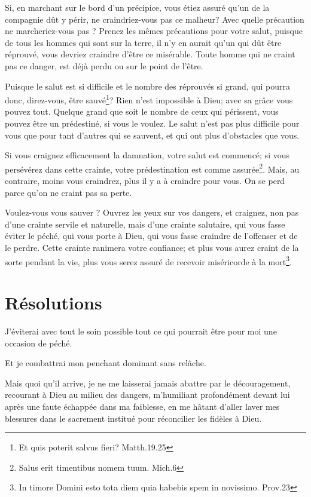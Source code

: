 \documentclass[instructions.tex]{subfiles}
\begin{document}
Si, en marchant sur le bord d'un précipice, vous étiez assuré qu'un de la compagnie dût y périr, ne craindriez-vous pas ce malheur? Avec quelle précaution ne marcheriez-vous pas ? Prenez les mêmes précautions pour votre salut, puisque de tous les hommes qui sont sur la terre, il n'y en aurait qu'un qui dût être réprouvé, vous devriez craindre d'être ce misérable. Toute homme qui ne craint pas ce danger, est déjà perdu ou sur le point de l'être.

Puisque le salut est si difficile et le nombre des réprouvés si grand, qui pourra donc, direz-vous, être sauvé\footnote{Et quis poterit salvus fieri? Matth.19.25}? Rien n'est impossible à Dieu; avec sa grâce vous pouvez tout. Quelque grand que soit le nombre de ceux qui périssent, vous pouvez être un prédestiné, si vous le voulez. Le salut n'est pas plus difficile pour vous que pour tant d'autres qui se sauvent, et qui ont plus d'obstacles que vous.

Si vous craignez efficacement la damnation, votre salut est commencé; si vous persévérez dans cette crainte, votre prédestination est comme assurée\footnote{Salus erit timentibus nomem tuum. Mich.6}. Mais, au contraire, moins vous craindrez, plus il y a à craindre pour vous. On se perd parce qu'on ne craint pas sa perte. 

Voulez-vous vous sauver ? Ouvrez les yeux sur vos dangers, et craignez, non pas d'une crainte servile et naturelle, mais d'une crainte salutaire, qui vous fasse éviter le péché, qui vous porte à Dieu, qui vous fasse craindre de l'offenser et de le perdre. Cette crainte ranimera votre confiance; et plus vous aurez craint de la sorte pendant la vie, plus vous serez assuré de recevoir miséricorde à la mort\footnote{In timore Domini esto tota diem quia habebis spem in novissimo. Prov.23}.

\section{Résolutions}

\primo J'éviterai avec tout le soin possible tout ce qui pourrait être pour moi une occasion de péché.

\secundo Et je combattrai mon penchant dominant sans relâche. 

\tertio Mais quoi qu'il arrive, je ne me laisserai jamais abattre par le découragement, recourant à Dieu au milieu des dangers, m'humiliant profondément devant lui après une faute échappée dans ma faiblesse, en me hâtant d'aller laver mes blessures dans le sacrement institué pour réconcilier les fidèles à Dieu.

\end{document}
